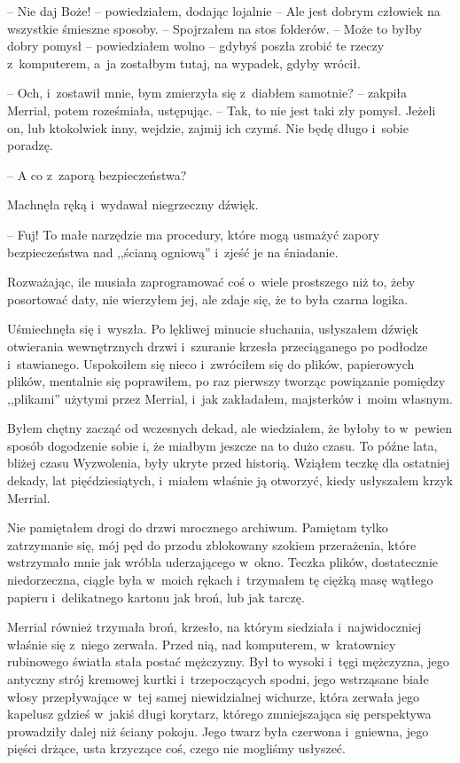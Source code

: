 \documentclass[oneside,polish,11pt,sfheadings]{mwbk}
\begin{document}
-- Nie daj Boże! -- powiedziałem, dodając lojalnie -- Ale jest dobrym
człowiek na wszystkie śmieszne sposoby. -- Spojrzałem na stos folderów. -- Może to byłby dobry pomysł -- powiedziałem wolno -- gdybyś poszła zrobić
te rzeczy z~komputerem, a~ja zostałbym tutaj, na wypadek, gdyby wrócił.

-- Och, i~zostawił mnie, bym zmierzyła się z~diabłem samotnie? -- zakpiła
Merrial, potem roześmiała, ustępując. -- Tak, to nie jest taki zły
pomysł. Jeżeli on, lub ktokolwiek inny, wejdzie, zajmij ich czymś. Nie
będę długo i~sobie poradzę.

-- A co z~zaporą bezpieczeństwa?

Machnęła ręką i~wydawał niegrzeczny dźwięk. 

-- Fuj! To małe narzędzie ma
procedury, które mogą usmażyć zapory bezpieczeństwa nad ,,ścianą ogniową'' i~zjeść je na śniadanie.

Rozważając, ile musiała zaprogramować coś o~wiele prostszego niż to,
żeby posortować daty, nie wierzyłem jej, ale zdaje się, że to była
czarna logika.

Uśmiechnęła się i~wyszła. Po lękliwej minucie słuchania, usłyszałem
dźwięk otwierania wewnętrznych drzwi i~szuranie krzesła przeciąganego po
podłodze i~stawianego. Uspokoiłem się nieco i~zwróciłem się do plików,
papierowych plików, mentalnie się poprawiłem, po raz pierwszy tworząc
powiązanie pomiędzy ,,plikami'' użytymi przez Merrial, i~jak zakładałem,
majsterków i~moim własnym.

Byłem chętny zacząć od wczesnych dekad, ale wiedziałem, że byłoby to w~pewien sposób dogodzenie sobie i, że miałbym jeszcze na to dużo czasu.
To późne lata, bliżej czasu Wyzwolenia, były ukryte przed historią.
Wziąłem teczkę dla ostatniej dekady, lat pięćdziesiątych, i~miałem
właśnie ją otworzyć, kiedy usłyszałem krzyk Merrial.

Nie pamiętałem drogi do drzwi mrocznego archiwum. Pamiętam tylko
zatrzymanie się, mój pęd do przodu zblokowany szokiem przerażenia, które
wstrzymało mnie jak wróbla uderzającego w~okno. Teczka plików,
dostatecznie niedorzeczna, ciągle była w~moich rękach i~trzymałem tę
ciężką masę wątłego papieru i~delikatnego kartonu jak broń, lub jak
tarczę.

Merrial również trzymała broń, krzesło, na którym siedziała i~najwidoczniej właśnie się z~niego zerwała. Przed nią, nad komputerem, w~kratownicy rubinowego światła stała postać mężczyzny. Był to wysoki i~tęgi mężczyzna, jego antyczny strój kremowej kurtki i~trzepoczących
spodni, jego wstrząsane białe włosy przepływające w~tej samej
niewidzialnej wichurze, która zerwała jego kapelusz gdzieś w~jakiś długi
korytarz, którego zmniejszająca się perspektywa prowadziły dalej niż
ściany pokoju. Jego twarz była czerwona i~gniewna, jego pięści drżące,
usta krzyczące coś, czego nie mogliśmy usłyszeć.
\end{document}
